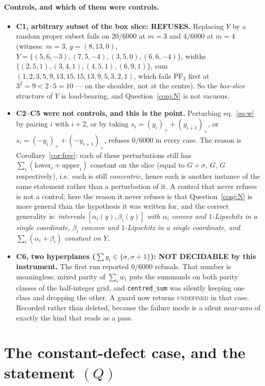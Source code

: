 \documentclass[11pt]{article}
\theoremstyle{plain}
\theoremstyle{definition}
\newcommand{\PFtwo}{\mathrm{PF}_2}
\newcommand{\pp}[1]{\left(#1\right)_{+}}
\begin{document}
\paragraph{Controls, and which of them were controls.}
\begin{itemize}
\item \textbf{C1, arbitrary subset of the box slice: REFUSES.} Replacing $Y$ by a random
  proper subset fails on $20/6000$ at $m=3$ and $4/6000$ at $m=4$ (witness: $m=3$,
  $g=(8,13,0)$, $Y=\{(5,6,-3),(7,5,-4),(3,5,0),(6,6,-4)\}$, widths
  $\{(2,5,1),(3,4,1),(4,5,1),(6,9,1)\}$, sum
  $(1,2,3,5,9,13,15,15,13,9,5,3,2,1)$, which fails $\PFtwo$ first at $3^2=9<2\cdot5=10$ ---
  on the shoulder, not at the centre). So the \emph{box-slice} structure of $Y$ is load-bearing, and
  Question~\ref{conj:N} is not vacuous.
\item \textbf{C2--C5 were not controls, and this is the point.} Perturbing
  eq.~\eqref{eq:w} by pairing $i$ with $i+2$, or by taking $s_i=\pp{y_i}+\pp{y_{i+1}}$,
  or $s_i=\pp{-y_i}+\pp{-y_{i+1}}$, refuses $0/6000$ in every case. The reason is
  Corollary~\ref{cor:free}: each of these perturbations still has
  $\sum_i(\text{lower}_i+\text{upper}_i)$ constant on the slice (equal to $G+\sigma$,
  $G$, $G$ respectively), i.e.\ each is still \emph{concentric}, hence each is another
  instance of the same statement rather than a perturbation of it. A control that never
  refuses is not a control; here the reason it never refuses is that
  Question~\ref{conj:N} is more general than the hypothesis it was written for, and the
  correct generality is: \emph{intervals $[\alpha_i(y),\beta_i(y)]$ with $\alpha_i$ convex
  and $1$-Lipschitz in a single coordinate, $\beta_i$ concave and $1$-Lipschitz in a
  single coordinate, and $\sum_i(\alpha_i+\beta_i)$ constant on $Y$.}
\item \textbf{C6, two hyperplanes ($\sum y_i\in\{\sigma,\sigma+1\}$): NOT DECIDABLE by
  this instrument.} The first run reported $0/6000$ refusals. That number is
  meaningless: mixed parity of $\sum_iw_i$ puts the summands on both parity classes of
  the half-integer grid, and \texttt{centred\_sum} was silently keeping one class and
  dropping the other. A guard now returns \textsc{undefined} in that case. Recorded
  rather than deleted, because the failure mode is a silent near-zero of exactly the kind
  that reads as a pass.
\end{itemize}

\section{The constant-defect case, and the statement $(Q)$}\label{sec:onesided}
\end{document}
